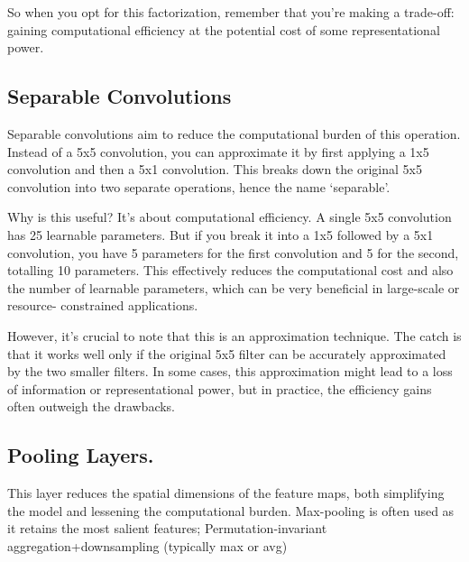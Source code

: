 \documentclass[11pt]{article}
\begin{document}
So when you opt for this factorization, remember that you're making a trade-off: gaining computational efficiency at the potential cost of some representational power.

\subsection{Separable Convolutions}

Separable convolutions aim to reduce the computational burden of this operation. Instead of a 5x5 convolution, you can approximate it by first applying a 1x5 convolution and then a 5x1 convolution. This breaks down the original 5x5 convolution into two separate operations, hence the name `separable'. 

Why is this useful? It's about computational efficiency. A single 5x5 convolution has 25 learnable parameters. But if you break it into a 1x5 followed by a 5x1 convolution, you have 5 parameters for the first convolution and 5 for the second, totalling 10 parameters. This effectively reduces the computational cost and also the number of learnable parameters, which can be very beneficial in large-scale or resource- constrained applications. 

However, it's crucial to note that this is an approximation technique. The catch is that it works well only if the original 5x5 filter can be accurately approximated by the two smaller filters. In some cases, this approximation might lead to a loss of information or representational power, but in practice, the efficiency gains often outweigh the drawbacks.



\subsection{Pooling Layers.}

This layer reduces the spatial dimensions of the feature maps, both simplifying the model and lessening the computational burden.  Max-pooling is often used as it retains the most salient features; Permutation-invariant aggregation+downsampling (typically max or avg)
\end{document}
